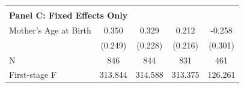\begin{table}[ht!]
{\begin{tabular}{l*{4}{c}}
\hline \\ \multicolumn{5}{l}{\textbf{Panel C: Fixed Effects Only}} \\
Mother's Age at Birth&       0.350   &       0.329   &       0.212   &      -0.258   \\
                    &     (0.249)   &     (0.228)   &     (0.216)   &     (0.301)   \\
\midrule
N                   &         846   &         844   &         831   &         461   \\
First-stage F       &     313.844   &     314.588   &     313.375   &     126.261   \\
\bottomrule \end{tabular}}\end{table}
